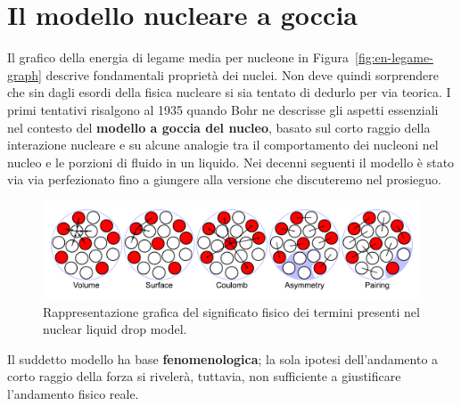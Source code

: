 \section{Il modello nucleare a goccia}\label{sec:il-modello-nucleare-a-goccia}
Il grafico della energia di legame media per nucleone in Figura~\ref{fig:en-legame-graph} descrive fondamentali proprietà dei nuclei.
Non deve quindi sorprendere che sin dagli esordi della fisica nucleare si sia tentato di dedurlo per via teorica.
I primi tentativi risalgono al 1935 quando Bohr ne descrisse gli aspetti essenziali nel contesto del \textbf{modello a goccia del nucleo},
basato sul corto raggio della interazione nucleare e su alcune analogie tra il comportamento dei nucleoni nel nucleo e le porzioni di fluido in un liquido.
Nei decenni seguenti il modello è stato via via perfezionato fino a giungere alla versione che discuteremo nel prosieguo.
\begin{figure}
	\centering
	\includegraphics{figs/liquid-drop-model}
	\caption{Rappresentazione grafica del significato fisico dei termini presenti nel nuclear liquid drop model.}
	\label{fig:liquid-drop-model}
\end{figure}

Il suddetto modello ha base \textbf{fenomenologica}; la sola ipotesi
dell'andamento a corto raggio della forza si rivelerà, tuttavia, non sufficiente a
giustificare l'andamento fisico reale.

